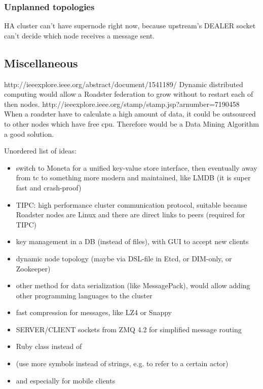 \subsubsection{Unplanned topologies}
HA cluster can't have supernode right now, because upstream's DEALER socket
can't decide which node receives a message sent.

\subsection{Miscellaneous}
http://ieeexplore.ieee.org/abstract/document/1541189/ Dynamic distributed computing would allow a Roadster federation to grow without to restart each of then nodes.
http://ieeexplore.ieee.org/stamp/stamp.jsp?arnumber=7190458 When a roadster have to calculate a high amount of data, it could be outsourced to other nodes which have free cpu.
Therefore would be a Data Mining Algorithm a good solution.

Unordered list of ideas:
\begin{itemize}
	\item switch to Moneta for a unified key-value store interface, then eventually away from \gls{tc} to something more modern and maintained, like LMDB (it is super fast and crash-proof)
	\item TIPC: high performance cluster communication protocol, suitable because Roadster nodes are Linux and there are direct links to peers (required for TIPC)
	\item key management in a DB (instead of files), with GUI to accept new clients
	\item dynamic node topology (maybe via DSL-file in Etcd, or DIM-only, or Zookeeper)
	\item other method for data serialization (like MessagePack), would allow adding other programming languages to the cluster
	\item fast compression for messages, like LZ4 or Snappy
	\item SERVER/CLIENT sockets from ZMQ 4.2 for simplified message routing
	\item Ruby  class instead of 
	\item (use more symbols instead of strings, e.g. to refer to a certain actor)
	\item {} and  especially for mobile clients
\end{itemize}

